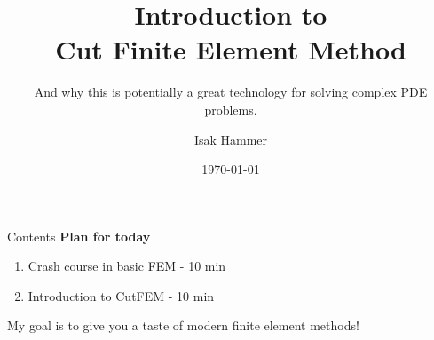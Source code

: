 \documentclass[aspectratio=169]{beamer}
\title[Your Short Title]{Introduction to \\ Cut Finite Element Method}
\subtitle{And why this is potentially a great technology for solving complex PDE problems.}
\author{Isak Hammer}
\date{\today}
\begin{document}
	\maketitle

	
	\begin{frame}{Contents}
        \textbf{Plan for today}
        \begin{enumerate}
        \item Crash course in basic FEM - 10 min
        \item Introduction to CutFEM - 10 min
        \end{enumerate}

        \begin{block}{My goal is to give you a taste of modern finite element methods!}

    \end{block}

	\end{frame}
	




    
\end{document}
